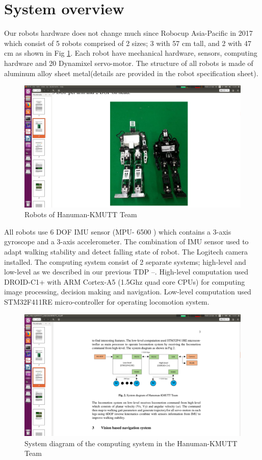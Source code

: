 \section{System overview}
Our robots hardware does not change much since Robocup Asia-Pacific in 2017 which consist of 5 robots comprised of 2 sizes; 3 with 57 cm tall, and 2 with 47 cm as shown in Fig \ref{fig:humanoid}. Each robot have mechanical hardware, sensors, computing hardware and 20 Dynamixel servo-motor. The structure of all robots is made of aluminum alloy sheet metal(details are provided in the robot specification sheet).
\begin{figure}[H]
	\centering
	\includegraphics[width=\textwidth,trim={15cm 0cm 5cm 5cm},clip]{image/humanoid.png}
	\caption{Robots of Hanuman-KMUTT Team}
	\label{fig:humanoid}
\end{figure}
All robots use 6 DOF IMU sensor (MPU- 6500 ) which contains a 3-axis gyroscope and a 3-axis accelerometer. The combination of IMU sensor used to adapt walking stability and detect falling state of robot. The Logitech camera installed. The computing system consist of 2 separate systems; high-level and low-level as we described in our previous TDP --. High-level computation used DROID-C1+ with ARM Cortex-A5 (1.5Ghz quad core CPUs) for computing image processing, decision making and navigation. Low-level computation used STM32F411RE micro-controller for operating locomotion system.
\begin{figure}[H]
	\centering
	\includegraphics[width=\textwidth,trim={20cm 15cm 10cm 12.5cm},clip]{image/sysDiagram.png}
	\caption{System diagram of the computing system in the Hanuman-KMUTT Team}
	\label{fig:sysDiagram}
\end{figure}